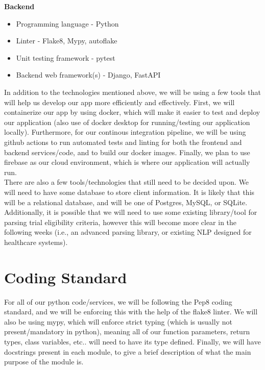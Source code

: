 \documentclass{article}
\begin{document}
\textbf{Backend}

\begin{itemize}
	\item Programming language - Python
	\item Linter - Flake8, Mypy, autoflake
	\item Unit testing framework - pytest
	\item Backend web framework(s) - Django, FastAPI\\
\end{itemize}

In addition to the technologies mentioned above, we will be using a few tools that will help us 
develop our app more efficiently and effectively. First, we will containerize our app
by using docker, which will make it easier to test and deploy our application (also use of docker desktop for running/testing
our application locally). Furthermore, for our continous 
integration pipeline, we will be using github actions to run automated tests and linting for both the frontend and backend 
services/code, and to build our docker images. Finally, we plan to use firebase as our cloud environment, which
is where our application will actually run. \\

There are also a few tools/technologies that still need to be decided upon. We will need to have some database to store
client information. It is likely that this will be a relational database, and will be one of Postgres, MySQL, or SQLite.
Additionally, it is possible that we will need to use some existing library/tool for parsing trial eligibility criteria, however this 
will become more clear in the following weeks (i.e., an advanced parsing library, or existing NLP designed for healthcare systems).

\section{Coding Standard}

For all of our python code/services, we will be following the Pep8 coding standard, and we will be enforcing this 
with the help of the flake8 linter. We will also be using mypy, which will enforce strict typing (which is usually not present/mandatory
in python), meaning all of our function parameters, return types, class variables, etc.. will need to have its type defined. Finally, we will
have docstrings present in each module, to give a brief description of what the main purpose of the module is.\\
\end{document}
